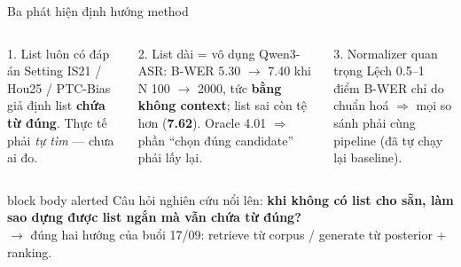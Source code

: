 \documentclass[aspectratio=169,xcolor=table]{beamer}
\newcommand{\bad}[1]{\textcolor{RiskRed}{\textbf{#1}}}
\begin{document}
\begin{frame}{Ba phát hiện định hướng method}
\begin{columns}[T,onlytextwidth]
\begin{block}{1. List luôn có đáp án}
\small Setting IS21 / Hou25 / PTC-Bias giả định list \textbf{chứa từ đúng}. Thực tế phải \emph{tự tìm} --- chưa ai đo.
\end{block}
\begin{alertblock}{2. List dài = vô dụng}
\small Qwen3-ASR: B-WER 5.30 $\rightarrow$ 7.40 khi N 100 $\rightarrow$ 2000, tức \textbf{bằng không context}; list sai còn tệ hơn (\bad{7.62}). Oracle 4.01 $\Rightarrow$ phần ``chọn đúng candidate'' phải lấy lại.
\end{alertblock}
\begin{block}{3. Normalizer quan trọng}
\small Lệch 0.5--1 điểm B-WER chỉ do chuẩn hoá $\Rightarrow$ mọi so sánh phải cùng pipeline (đã tự chạy lại baseline).
\end{block}
\end{columns}
\vspace{0.3cm}
\begin{beamercolorbox}[sep=0.45em,center,rounded=true]{block body alerted}
\small Câu hỏi nghiên cứu nổi lên: \textbf{khi không có list cho sẵn, làm sao dựng được list ngắn mà vẫn chứa từ đúng?}\\
$\rightarrow$ đúng hai hướng của buổi 17/09: retrieve từ corpus / generate từ posterior + ranking.
\end{beamercolorbox}
\end{frame}

\end{document}
